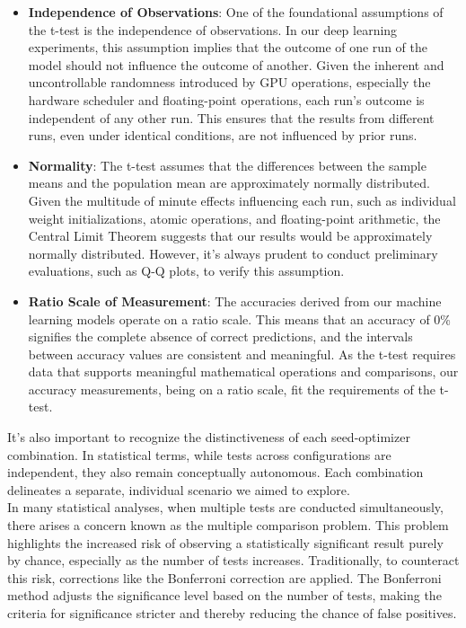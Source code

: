 \begin{itemize}
    \item \textbf{Independence of Observations}: One of the foundational assumptions of the t-test is the independence of observations. In our deep learning experiments, this assumption implies that the outcome of one run of the model should not influence the outcome of another. Given the inherent and uncontrollable randomness introduced by GPU operations, especially the hardware scheduler and floating-point operations, each run's outcome is independent of any other run. This ensures that the results from different runs, even under identical conditions, are not influenced by prior runs.

    \item \textbf{Normality}: The t-test assumes that the differences between the sample means and the population mean are approximately normally distributed. Given the multitude of minute effects influencing each run, such as individual weight initializations, atomic operations, and floating-point arithmetic, the Central Limit Theorem suggests that our results would be approximately normally distributed. However, it's always prudent to conduct preliminary evaluations, such as Q-Q plots, to verify this assumption.

    \item \textbf{Ratio Scale of Measurement}: The accuracies derived from our machine learning models operate on a ratio scale. This means that an accuracy of 0\% signifies the complete absence of correct predictions, and the intervals between accuracy values are consistent and meaningful. As the t-test requires data that supports meaningful mathematical operations and comparisons, our accuracy measurements, being on a ratio scale, fit the requirements of the t-test.
\end{itemize}

It's also important to recognize the distinctiveness of each seed-optimizer combination. In statistical terms, while tests across configurations are independent, they also remain conceptually autonomous. Each combination delineates a separate, individual scenario we aimed to explore.\\

In many statistical analyses, when multiple tests are conducted simultaneously, there arises a concern known as the multiple comparison problem. This problem highlights the increased risk of observing a statistically significant result purely by chance, especially as the number of tests increases. Traditionally, to counteract this risk, corrections like the Bonferroni correction are applied. The Bonferroni method adjusts the significance level based on the number of tests, making the criteria for significance stricter and thereby reducing the chance of false positives.\\

